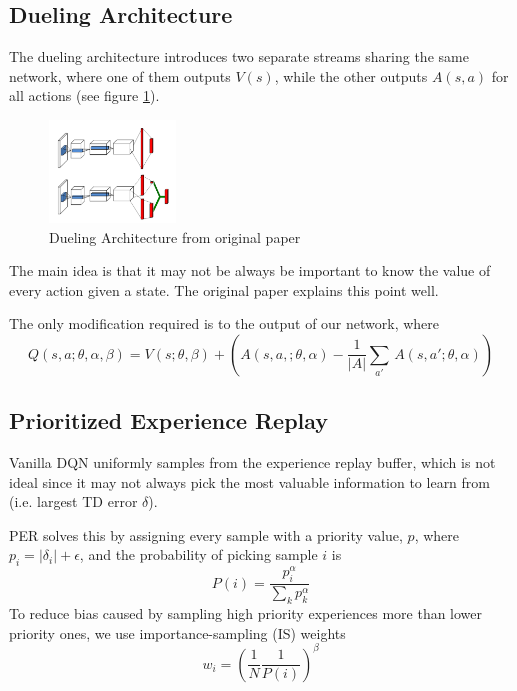 \documentclass[12pt]{article} %
\begin{document}
\subsection{Dueling Architecture}
The dueling architecture introduces two separate streams sharing the same network, where one of them outputs $V(s)$, while the other outputs $A(s,a)$ for all actions (see figure \ref{fig:duelingarch}).

\begin{figure}
  \begin{center}
    \includegraphics[width=0.3\textwidth]{images/duelingarch.png}
  \end{center}
  \caption{Dueling Architecture from original paper}
  \label{fig:duelingarch}
\end{figure}

The main idea is that it may not be always be important to know the value of every action given a state. The original paper explains this point well.

The only modification required is to the output of our network, where 
\begin{equation*}
    Q(s,a;\theta,\alpha,\beta) = V(s; \theta, \beta) + (A(s,a,;\theta,\alpha) - \frac{1}{|A|}\sum_{a'}\, A(s,a';\theta,\alpha))
\end{equation*}

\subsection{Prioritized Experience Replay}
Vanilla DQN uniformly samples from the experience replay buffer, which is not ideal since it may not always pick the most valuable information to learn from (i.e. largest TD error $\delta$).

PER solves this by assigning every sample with a priority value, $p$, where $p_i = |\delta_i| + \epsilon$, and the probability of picking sample $i$ is
\begin{equation*}
    P(i) = \frac{p_i^\alpha}{\sum_k p_k^\alpha}
\end{equation*}
To reduce bias caused by sampling high priority experiences more than lower priority ones, we use importance-sampling (IS) weights
\begin{equation*}
    w_i = (\frac{1}{N}\frac{1}{P(i)})^\beta
\end{equation*}
\end{document}

